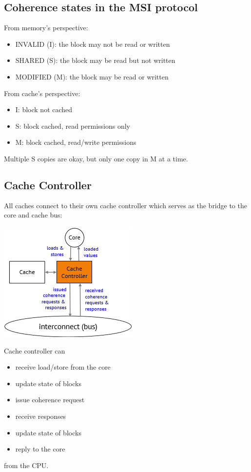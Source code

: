 \documentclass[letterpaper,12pt]{article}
\begin{document}
\subsection{Coherence states in the MSI protocol}
From memory's perspective:
\begin{itemize}
    \item INVALID (I): the block may not be read or written
    \item SHARED (S): the block may be read but not written
    \item MODIFIED (M): the block may be read or written
\end{itemize}
From cache's perspective:\begin{itemize}
    \item I: block not cached
    \item S: block cached, read permissions only
    \item M: block cached, read/write permissions
\end{itemize}
Multiple S copies are okay, but only one copy in M at a time.
\subsection{Cache Controller}
All caches connect to their own cache controller which serves as the bridge to the core and cache bus:

\includegraphics*{./Image/Cache Controller.png}

Cache controller can
\begin{itemize}
    \item receive load/store from the core
    \item update state of blocks
    \item issue coherence request
    \item receive responses
    \item update state of blocks
    \item reply to the core
\end{itemize}
from the CPU.
\end{document}
